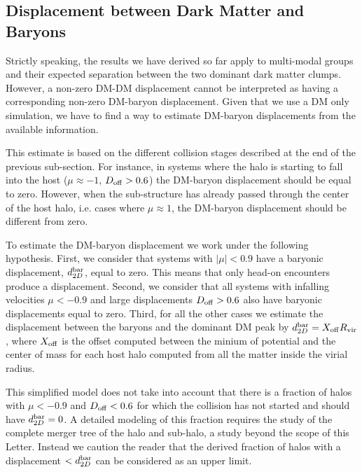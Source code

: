 \documentclass{emulateapj}
\begin{document}
\subsection{Displacement between Dark Matter and Baryons}
\label{sec:baryonic_displacements}



Strictly speaking, the results we have derived so far apply to multi-modal
groups and their expected separation between the two dominant dark
matter clumps. However, a non-zero DM-DM displacement cannot be
interpreted as having a corresponding non-zero DM-baryon
displacement. Given that we use a DM only simulation, we have to find
a way to estimate DM-baryon displacements from the available information.


This estimate is based on the different collision stages described at
the end of the previous sub-section.  For instance, in systems where
the halo is starting to fall into the host ($\mu\approx-1$, $D_{\rm
  off}>0.6$) the DM-baryon displacement should be equal to
zero. However, when the  sub-structure has already passed through the
center of the host halo, i.e. cases where $\mu\approx 1$, the
DM-baryon displacement should be different from zero.

To estimate the DM-baryon displacement we  work under the following
hypothesis. First, we consider that systems with $|\mu|<0.9$ have a
baryonic displacement, $d_{2D}^{\rm bar}$, equal to zero. This means
that only head-on encounters produce a displacement. Second, we
consider that all systems with infalling velocities $\mu<-0.9$ and
large displacements $D_{\rm off}>0.6$ also have baryonic displacements
equal to zero. Third, for all the other cases we estimate the
displacement between the baryons and the dominant DM peak by
$d_{2D}^{\rm bar} = X_{\rm off} R_{\rm   vir}$, where $X_{\rm   off}$
is the offset computed between the minium of potential and the center
of mass for each host halo computed from all the matter inside the
virial radius. 


This simplified model does not take into account that there is a
fraction of halos with $\mu<-0.9$ and $D_{\rm off}<0.6$ for which the
collision has not started and should have $d_{2D}^{\rm bar}=0$. A detailed
modeling of this fraction requires the study of the complete merger
tree of the halo and sub-halo, a study beyond the scope of this
Letter. Instead we caution the reader that the derived fraction of
halos with a displacement $<d_{2D}^{\rm bar}$ can be considered as an
upper limit. 
\end{document}
